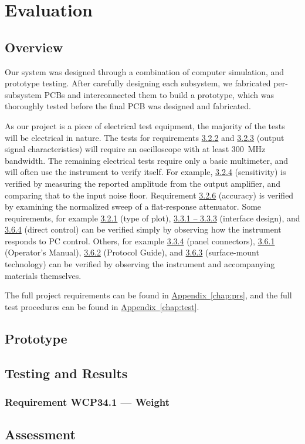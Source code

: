 \chapter{Evaluation}

\section{Overview}
Our system was designed through a combination of computer simulation, and
prototype testing. After carefully designing each subsystem, we fabricated
per-subsystem PCBs and interconnected them to build a prototype, which was
thoroughly tested before the final PCB was designed and fabricated.

As our project is a piece of electrical test equipment, the majority of the
tests will be electrical in nature. The tests for requirements \hyperref[prs:3.2.2]{3.2.2}
and \hyperref[prs:3.2.3]{3.2.3} (output signal characteristics) will require
an oscilloscope with at least $300$~MHz bandwidth. The remaining electrical
tests require only a basic multimeter, and will often use the instrument to
verify itself. For example, \hyperref[prs:3.2.4]{3.2.4} (sensitivity) is
verified by measuring the reported amplitude from the output amplifier, and
comparing that to the input noise floor. Requirement \hyperref[prs:3.2.6]{3.2.6}
(accuracy) is verified by examining the normalized sweep of a flat-response
attenuator. Some requirements, for example \hyperref[prs:3.2.1]{3.2.1} (type
of plot), \hyperref[prs:3.3.1]{3.3.1 -- 3.3.3} (interface design), and \hyperref[prs:3.6.4]{3.6.4}
(direct control) can be verified simply by observing how the instrument responds to
PC control. Others, for example \hyperref[prs:3.3.4]{3.3.4} (panel connectors),
\hyperref[prs:3.6.1]{3.6.1} (Operator's Manual), \hyperref[prs:3.6.2]{3.6.2} (Protocol Guide),
and \hyperref[prs:3.6.3]{3.6.3} (surface-mount technology) can be verified by observing the
instrument and accompanying materials themselves.

The full project requirements can be found in \hyperref[chap:prs]{Appendix~\ref{chap:prs}}, and the full
test procedures can be found in \hyperref[chap:test]{Appendix~\ref{chap:test}}.

\section{Prototype}

\section{Testing and Results}

\subsection{Requirement WCP34.1 --- Weight}

\section{Assessment}
